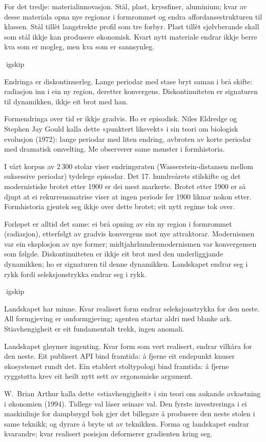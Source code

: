 For det tredje: materialinnovasjon. Stål, plast, kryssfiner, aluminium; kvar av desse materiala opna nye regionar i formrommet og endra affordansestrukturen til klassen. Stål tillèt langstrekte profil som tre forbyr. Plast tillèt sjølvberande skall som stål ikkje kan produsere økonomisk. Kvart nytt materiale endrar ikkje berre kva som er mogleg, men kva som er sannsynleg.

igskip

Endringa er diskontinuerleg. Lange periodar med stase bryt saman i brå skifte: radiasjon inn i ein ny region, deretter konvergens. Diskontinuiteten er signaturen til dynamikken, ikkje eit brot med han.

Formendringa over tid er ikkje gradvis. Ho er episodisk. Niles Eldredge og Stephen Jay Gould kalla dette «punktert likevekt» i sin teori om biologisk evolusjon (1972): lange periodar med liten endring, avbroten av korte periodar med dramatisk omvelting. Me observerer same mønster i formhistoria.

I vårt korpus av 2\,300 stolar viser endringsraten (Wasserstein-distansen mellom suksessive periodar) tydelege episodar. Det 17. hundreårets stilskifte og det modernistiske brotet etter 1900 er dei mest markerte. Brotet etter 1900 er så djupt at ei rekurrensmatrise viser at ingen periode før 1900 liknar nokon etter. Formhistoria gjentek seg ikkje over dette brotet; eit nytt regime tok over.

Forløpet er alltid det same: ei brå opning av ein ny region i formrommet (radiasjon), etterfølgt av gradvis konvergens mot nye attraktorar. Modernismen var ein eksplosjon av nye former; midtjahrhundremodernismen var konvergensen som følgde. Diskontinuiteten er ikkje eit brot med den underliggjande dynamikken; ho er signaturen til denne dynamikken. Landskapet endrar seg i rykk fordi seleksjonstrykka endrar seg i rykk.

igskip

Landskapet har minne. Kvar realisert form endrar seleksjonstrykka for den neste. All formgjeving er omformgjeving; agenten startar aldri med blanke ark. Stiavhengigheit er eit fundamentalt trekk, ingen anomali.

Landskapet gløymer ingenting. Kvar form som vert realisert, endrar vilkåra for den neste. Eit publisert API bind framtida: å fjerne eit endepunkt knuser økosystemet rundt det. Ein etablert stoltypologi bind framtida: å fjerne ryggstøtta krev eit heilt nytt sett av ergonomiske argument.

W.~Brian Arthur kalla dette «stiavhengigheit» i sin teori om aukande avkastning i økonomien (1994). Tidlege val låser seinare val. Den fyrste investreringa i ei maskinlinje for dampbøygd bøk gjer det billegare å produsere den neste stolen i same teknikk; og dyrare å bryte ut av teknikken. Forma og landskapet endrar kvarandre; kvar realisert posisjon deformerer gradienten kring seg.

